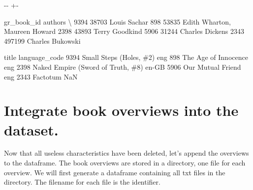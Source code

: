 \documentclass[letterpaper,10pt,english]{sphinxmanual}
\newlength\nbsphinxcodecellspacing
\begin{document}
{

\kern-\sphinxverbatimsmallskipamount\kern-\baselineskip
\kern+\FrameHeightAdjust\kern-\fboxrule
\vspace{\nbsphinxcodecellspacing}

\begin{sphinxVerbatim}[commandchars=\\\{\}]
\llap{\color{nbsphinxout}[13]:\,\hspace{\fboxrule}\hspace{\fboxsep}}      gr\_book\_id                        authors  \textbackslash{}
9394       38703                   Louis Sachar
898        53835  Edith Wharton, Maureen Howard
2398       43893                 Terry Goodkind
5906       31244                Charles Dickens
2343      497199               Charles Bukowski

                                  title language\_code
9394            Small Steps (Holes, \#2)           eng
898                The Age of Innocence           eng
2398  Naked Empire (Sword of Truth, \#8)         en-GB
5906                  Our Mutual Friend           eng
2343                           Factotum           NaN
\end{sphinxVerbatim}
}


\section{Integrate book overviews into the dataset.}
\label{\detokenize{Data preprocessing:Integrate-book-overviews-into-the-dataset.}}
Now that all useless characteristics have been deleted, let’s append the overviews to the dataframe. The book overviews are stored in a directory, one  file for each overview. We will first generate a dataframe containing all txt files in the directory. The filename for each  file is the  identifier.

{
\begin{sphinxVerbatim}[commandchars=\\\{\}]
\llap{\color{nbsphinxin}[14]:\,\hspace{\fboxrule}\hspace{\fboxsep}}  
\end{sphinxVerbatim}
}
\end{document}
